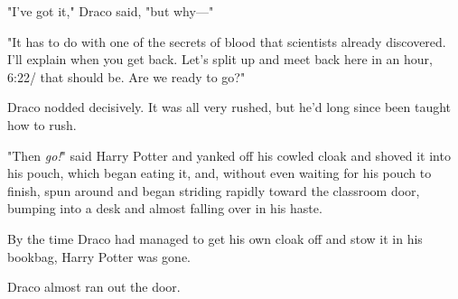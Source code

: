 "I've got it," Draco said, "but why\mbox{---}"

"It has to do with one of the secrets of blood that scientists already
discovered. I'll explain when you get back. Let's split up and meet back here
in an hour, 6:22\PM/ that should be. Are we ready to go?"

Draco nodded decisively. It was all very rushed, but he'd long since been
taught how to rush.

"Then \emph{go!}" said Harry Potter and yanked off his cowled cloak and shoved
it into his pouch, which began eating it, and, without even waiting for his
pouch to finish, spun around and began striding rapidly toward the classroom
door, bumping into a desk and almost falling over in his haste.

By the time Draco had managed to get his own cloak off and stow it in his
bookbag, Harry Potter was gone.

Draco almost ran out the door.
